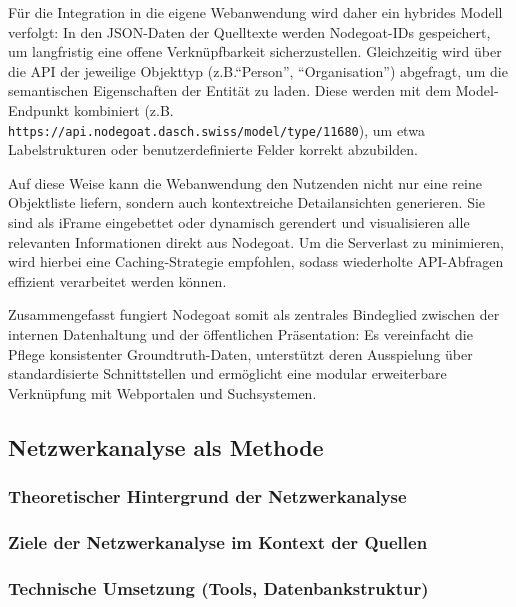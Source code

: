 \documentclass[12pt, a4paper, ngerman, bidi=default]{article}
\newcommand{\code}[1]{\colorbox{VeryLightGray}{\texttt{#1}}} %
\begin{document}
Für die Integration in die eigene Webanwendung wird daher ein hybrides Modell verfolgt: In den JSON-Daten der Quelltexte werden Nodegoat-IDs gespeichert, um langfristig eine offene Verknüpfbarkeit sicherzustellen. 
Gleichzeitig wird über die API der jeweilige Objekttyp (z.B.\enquote{Person}, \enquote{Organisation}) abgefragt, um die semantischen Eigenschaften der Entität zu laden. Diese werden mit dem 
Model-Endpunkt kombiniert (z.B. \code{https://api.nodegoat.dasch.swiss/model/type/11680}), um etwa Labelstrukturen oder benutzerdefinierte Felder korrekt abzubilden.

Auf diese Weise kann die Webanwendung den Nutzenden nicht nur eine reine Objektliste liefern, sondern auch kontextreiche Detailansichten generieren. Sie sind als iFrame eingebettet oder dynamisch 
gerendert und visualisieren alle relevanten Informationen direkt aus Nodegoat. Um die Serverlast zu minimieren, wird hierbei eine Caching-Strategie empfohlen, sodass wiederholte API-Abfragen 
effizient verarbeitet werden können.

Zusammengefasst fungiert Nodegoat somit als zentrales Bindeglied zwischen der internen Datenhaltung und der öffentlichen Präsentation: Es vereinfacht die Pflege konsistenter Groundtruth-Daten, 
unterstützt deren Ausspielung über standardisierte Schnittstellen und ermöglicht eine modular erweiterbare Verknüpfung mit Webportalen und Suchsystemen.



\subsection{Netzwerkanalyse als Methode}
  \subsubsection{Theoretischer Hintergrund der Netzwerkanalyse}
  \subsubsection{Ziele der Netzwerkanalyse im Kontext der Quellen}
  \subsubsection{Technische Umsetzung (Tools, Datenbankstruktur)}



\end{document}
